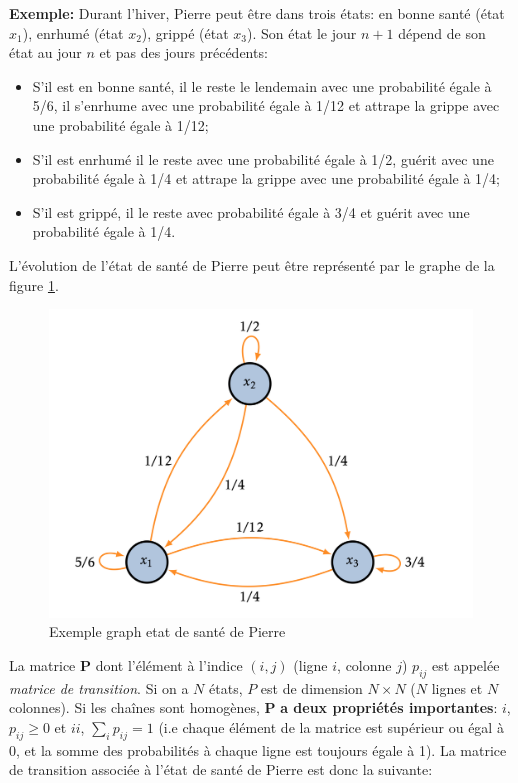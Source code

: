 \noindent \textbf{Exemple:} Durant l’hiver, Pierre peut être dans trois états: en bonne santé (état $x_1$), enrhumé (état $x_2$), grippé (état $x_3$). Son état le jour $n+1$ dépend de son état au jour $n$ et pas des jours précédents:
\begin{itemize}
    \item S’il est en bonne santé, il le reste le lendemain avec une probabilité égale à 5/6, il s’enrhume avec une probabilité égale à 1/12 et attrape la grippe avec une probabilité égale à 1/12;
    \item S’il est enrhumé il le reste avec une probabilité égale à 1/2, guérit avec une probabilité égale à 1/4 et attrape la grippe
avec une probabilité égale à 1/4;
    \item S’il est grippé, il le reste avec probabilité égale à 3/4 et guérit avec une probabilité égale à 1/4.
\end{itemize}

L’évolution de l’état de santé de Pierre peut être représenté par le graphe de la figure \ref{fig:graph_markov_exemple}.

\begin{figure}[h!]
    \centering
    \includegraphics[width=.7\textwidth]{resources/graph_markov_example.png}
    \caption{Exemple graph etat de santé de Pierre}
    \label{fig:graph_markov_exemple}
\end{figure}

La matrice $\mathbf{P}$ dont l'élément à l'indice $(i,j)$ (ligne $i$, colonne $j$) $p_{ij}$ est appelée \textit{matrice de transition}. Si on a $N$ états, $P$ est de dimension $N \times N$ ($N$ lignes et $N$ colonnes). Si les chaînes sont homogènes, $\mathbf{P}$ \textbf{a deux propriétés importantes}: $i$, $p_{ij} \geq 0$ et $ii$, $\sum_i p_{ij} = 1$ (i.e chaque élément de la matrice est supérieur ou égal à 0, et la somme des probabilités à chaque ligne est toujours égale à 1). La matrice de transition associée à l'état de santé de Pierre est donc la suivante:


